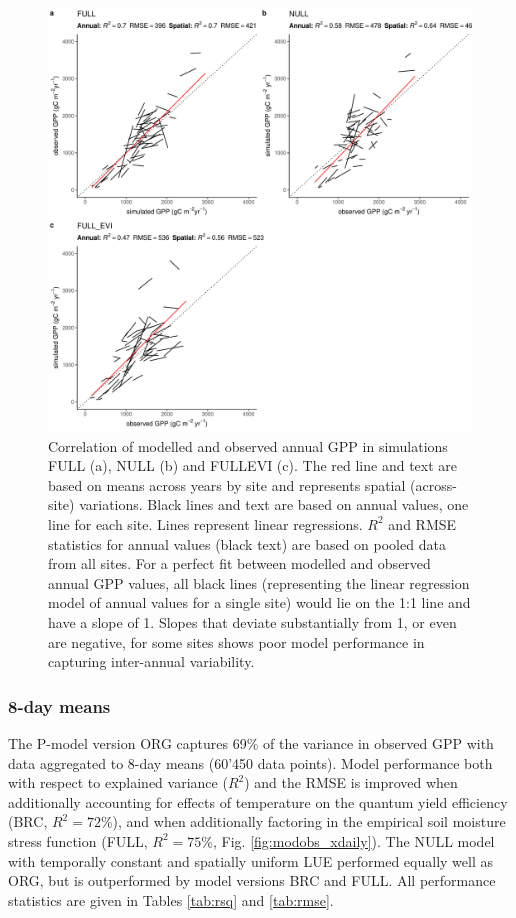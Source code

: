\documentclass[gmd, manuscript]{copernicus}
\newcommand{\rsq}{$R^2$}
\begin{document}
\begin{figure}[!ht]
    \includegraphics[width=\textwidth]{fig/modobs_spatial_annual.pdf}
    \caption{Correlation of modelled and observed annual GPP in simulations FULL (a), NULL (b) and FULL\textunderscore EVI (c). The red line and text are based on means across years by site and represents spatial (across-site) variations. Black lines and text are based on annual values, one line for each site. Lines represent linear regressions. $R^2$ and RMSE statistics for annual values (black text) are based on pooled data from all sites. For a perfect fit between modelled and observed annual GPP values, all black lines (representing the linear regression model of annual values for a single site) would lie on the 1:1 line and have a slope of 1. Slopes that deviate substantially from 1, or even are negative, for some sites shows poor model performance in capturing inter-annual variability.}
    \label{fig:modobs_spatialannual}
\end{figure}


\subsubsection{8-day means}

The P-model version ORG captures 69\% of the variance in observed GPP with data aggregated to 8-day means (60’450 data points). Model performance both with respect to explained variance (\rsq ) and the RMSE is improved when additionally accounting for effects of temperature on the quantum yield efficiency (BRC, \rsq $= 72$\%), and when additionally factoring in the empirical soil moisture stress function (FULL, \rsq $= 75$\%, Fig. \ref{fig:modobs_xdaily}). The NULL model with temporally constant and spatially uniform LUE performed equally well as ORG, but is outperformed by model versions BRC and FULL. All performance statistics are given in Tables \ref{tab:rsq} and \ref{tab:rmse}.
\end{document}
